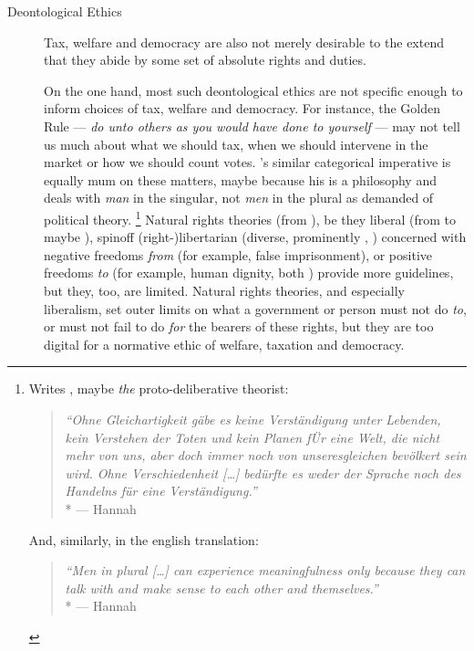 \begin{description}
	\item[Deontological Ethics]
		\label{itm:deontological}
	Tax, welfare and democracy are also not merely desirable to the extend that they abide by some set of absolute rights and duties.

	On the one hand, most such deontological ethics are not specific enough to inform choices of tax, welfare and democracy.
	For instance, the Golden Rule --- \emph{do unto others as you would have done to yourself} --- may not tell us much about what we should tax, when we should intervene in the market or how we should count votes.
	\citeauthor{Kant1781}'s similar categorical imperative is equally mum on these matters, maybe because his is a philosophy and %
	deals with \emph{man} in the singular, not \emph{men} in the plural as \citeauthor{Arendt1958} demanded of political theory.
	\footnote{
		Writes \citeauthor{Arendt1958}, maybe \emph{the} proto-deliberative theorist:
		\begin{quote}
			\emph{``Ohne Gleichartigkeit gäbe es keine Verständigung unter Lebenden, kein Verstehen der Toten und kein Planen fÜr eine Welt, die nicht mehr von uns, aber doch immer noch von unseresgleichen bevölkert sein wird.
			Ohne Verschiedenheit [\ldots] bedürfte es weder der Sprache noch des Handelns für eine Verständigung.''}
			\\*
			--- Hannah \citet{Arendt1958}
		\end{quote}
		And, similarly, in the english translation:
		\begin{quote}
			\emph{``Men in plural [\ldots] can experience meaningfulness only because they can talk with and make sense to each other and themselves.''}
			\\*
			--- Hannah \citet[Prologue]{Arendt1958}
		\end{quote}
	}
	Natural rights theories (from \citeauthor{Grotius1625}), be they liberal (from \citealt{Locke1689a} to maybe \citealt{Rawls-1993-aa}), spinoff (right-)libertarian (diverse, prominently \citealt{Hayek1944}, \citealt{Nozick1974}) concerned with negative freedoms \emph{from} (for example, false imprisonment), or positive freedoms \emph{to} (for example, human dignity, both \citealt{Berlin1969}) provide more guidelines, but they, too, are limited.
	Natural rights theories, and especially liberalism, set outer limits on what a government or person must not do \emph{to}, or must not fail to do \emph{for} the bearers of these rights, but they are too digital for a normative ethic of welfare, taxation and democracy.

\end{description}
